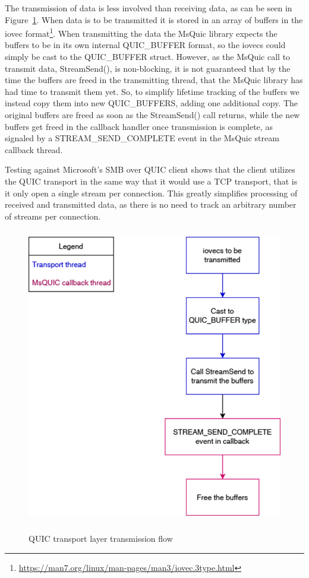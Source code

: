 \documentclass[english, 12pt, a4paper, elec, utf8, a-2b, online]{aaltothesis}
\begin{document}
The transmission of data is less involved than receiving data, as can be seen
in Figure~\ref{fig:msquic_tx}. When data is to be transmitted it is stored in
an array of buffers in the iovec format\footnote{\url{https://man7.org/linux/man-pages/man3/iovec.3type.html}}. When transmitting the data the MsQuic
library expects the buffers to be in its own internal QUIC\_BUFFER format,
so the iovecs could simply be cast to the QUIC\_BUFFER struct. However, as the MsQuic call to transmit
data, StreamSend(), is non-blocking, it is not guaranteed that by the time the buffers
are freed in the transmitting thread, that the MsQuic library has had time to transmit them yet.
So, to simplify lifetime tracking of the buffers we instead copy them into new QUIC\_BUFFERS,
adding one additional copy.
The original buffers are freed as soon as the StreamSend() call returns, while the new
buffers get freed in the callback handler once transmission is complete, as signaled by a STREAM\_SEND\_COMPLETE
event in the MsQuic stream callback thread.

Testing against Microsoft's SMB over QUIC client shows that the client utilizes the
QUIC transport in the same way that it would use a TCP transport, that is it only
open a single stream per connection. This greatly simplifies processing of received
and transmitted data, as there is no need to track an arbitrary number of streams
per connection.

\begin{figure}[h]
	\centering
	\includegraphics[alt={Block diagram of the flow when sending data using the MsQuic library}, height=13cm]{./images/send_flow.png}
	\caption{QUIC transport layer transmission flow}
	\label{fig:msquic_tx}
\end{figure}
\end{document}

